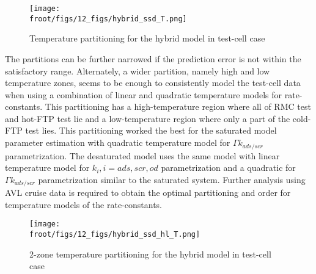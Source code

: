 \begin{figure}[H]
        \centering
        \texttt{[image: \\froot/figs/12\_figs/hybrid\_ssd\_T.png]}
        \caption{Temperature partitioning for the hybrid model in test-cell case}
\end{figure}

The partitions can be further narrowed if the prediction error is not within the satisfactory range. Alternately, a
wider partition, namely high and low temperature zones, seems to be enough to consistently model the test-cell data when
using a combination of linear and quadratic temperature models for rate-constants. This partitioning has a
high-temperature region where all of RMC test and hot-FTP test lie and a low-temperature region where only a part of the
cold-FTP test lies. This partitioning worked the best for the saturated model parameter estimation with quadratic
temperature model for $\Gamma k_{ads/scr}$ parametrization. The desaturated model uses the same model with linear
temperature model for $k_i, i=ads, scr, od$ parametrization and a quadratic for $\Gamma k_{ads/scr}$ parametrization
similar to the saturated system. Further analysis using AVL cruise data is required to obtain the optimal partitioning
and order for temperature models of the rate-constants.

\begin{figure}[H]
        \centering
        \texttt{[image: \\froot/figs/12\_figs/hybrid\_ssd\_hl\_T.png]}
        \caption{2-zone temperature partitioning for the hybrid model in test-cell case}
\end{figure}
